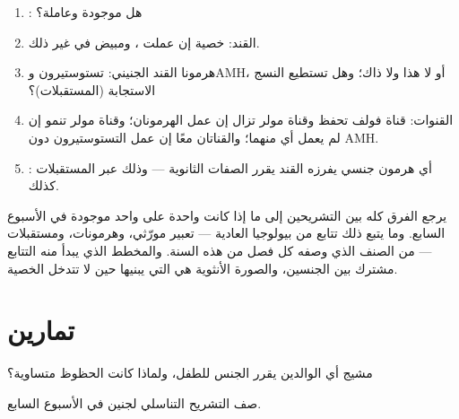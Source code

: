 \begin{method}\label{met:g11:becoming-male-female:case}
\begin{enumerate}
  \item {}: هل  موجودة وعاملة؟
  \item القند: خصية إن عملت ، ومبيض في غير ذلك.
  \item هرمونا القند الجنيني: تستوستيرون وAMH، أو لا هذا ولا ذاك؛ وهل
        تستطيع النسج الاستجابة (المستقبلات)؟
  \item القنوات: قناة فولف تحفظ وقناة مولر تزال إن عمل الهرمونان؛
        وقناة مولر تنمو إن لم يعمل أي منهما؛ والقناتان معًا إن عمل
        التستوستيرون دون AMH.
  \item {}: أي هرمون جنسي يفرزه القند يقرر الصفات الثانوية ---
        وذلك عبر المستقبلات كذلك.
\end{enumerate}
\end{method}

\begin{remark}\label{rem:g11:becoming-male-female:onegene}
يرجع الفرق كله بين التشريحين إلى ما إذا كانت  واحدة على  واحد
موجودة في الأسبوع السابع. وما يتبع ذلك تتابع من بيولوجيا 
العادية --- تعبير مورّثي، وهرمونات، ومستقبلات --- من الصنف الذي وصفه كل
فصل من هذه السنة. والمخطط الذي يبدأ منه التتابع مشترك بين الجنسين،
والصورة الأنثوية هي التي يبنيها حين لا تتدخل الخصية.
\end{remark}

\section{تمارين}

\begin{exercise}[$\star$]\label{exo:g11:becoming-male-female:1}
مشيج أي الوالدين يقرر الجنس  للطفل، ولماذا كانت الحظوظ متساوية؟
\end{exercise}

\begin{exercise}[$\star$]\label{exo:g11:becoming-male-female:2}
صف التشريح التناسلي لجنين في الأسبوع السابع.
\end{exercise}

